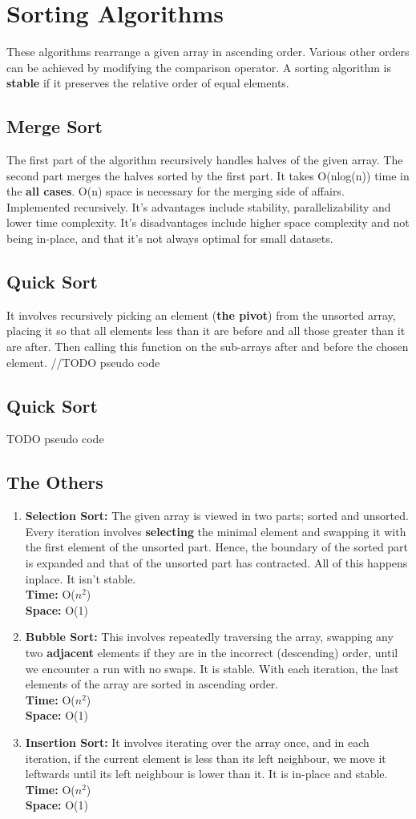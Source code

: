 \documentclass{report}
\newcommand*{\algodis}[4]{
    \textbf{#1:} #2\\%
    \textbf{Time:} #3 \\%
    \textbf{Space:} #4
}
\begin{document}
\section{Sorting Algorithms}
These algorithms rearrange a given array in ascending order.
Various other orders can be achieved by modifying the comparison operator.
A sorting algorithm is \textbf{stable} if it preserves the relative
order of equal elements.
\subsection*{Merge Sort}
The first part of the algorithm recursively handles halves of the given array.
The second part merges the halves sorted by the first part.
It takes O(nlog(n)) time in the \textbf{all cases}. O(n) space is necessary
for the merging side of affairs. Implemented recursively. It's advantages
include stability, parallelizability and lower time complexity. It's disadvantages
include higher space complexity and not being in-place, and that it's not
always optimal for small datasets. 
\subsection*{Quick Sort}
It involves recursively picking an element (\textbf{the pivot})
from the unsorted array, 
placing it so that all elements less than it are before and all
those greater than it are after. Then calling this function on the sub-arrays
after and before the chosen element.
//TODO pseudo code
\subsection*{Quick Sort}
TODO pseudo code
\subsection*{The Others}
\begin{enumerate}
    \item \algodis{Selection Sort}
    {The given array is viewed in two parts; sorted and unsorted.
    Every iteration involves \textbf{selecting} the minimal element
    and swapping it with the first element of the unsorted part. Hence,
    the boundary of the sorted part is expanded and that of the unsorted
    part has contracted. All of this happens inplace. It isn't stable.}
    {O($n^2$)}{O(1)}
    \item \algodis{Bubble Sort}
    {This involves repeatedly traversing the array,
    swapping any two \textbf{adjacent} elements if they are
    in the incorrect (descending) order, until we encounter
    a run with no swaps. It is stable. With each iteration,
    the last elements of the array are sorted in ascending order.}
    {O($n^2$)}
    {O(1)}
    \item \algodis{Insertion Sort}
    {It involves iterating over the array once, and in each iteration,
    if the current element is less than its left neighbour, we move it
    leftwards until its left neighbour is lower than it. It is in-place
    and stable.}
    {O($n^2$)}{O(1)}
\end{enumerate}
\end{document}
